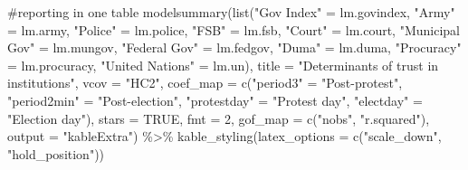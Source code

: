 \documentclass[
  letterpaper,
  DIV=11,
  numbers=noendperiod]{scrartcl}
\newenvironment{Shaded}{\begin{snugshade}}{\end{snugshade}}
\newcommand{\AttributeTok}[1]{\textcolor[rgb]{0.40,0.45,0.13}{#1}}
\newcommand{\CommentTok}[1]{\textcolor[rgb]{0.37,0.37,0.37}{#1}}
\newcommand{\ConstantTok}[1]{\textcolor[rgb]{0.56,0.35,0.01}{#1}}
\newcommand{\DecValTok}[1]{\textcolor[rgb]{0.68,0.00,0.00}{#1}}
\newcommand{\FunctionTok}[1]{\textcolor[rgb]{0.28,0.35,0.67}{#1}}
\newcommand{\NormalTok}[1]{\textcolor[rgb]{0.00,0.23,0.31}{#1}}
\newcommand{\OtherTok}[1]{\textcolor[rgb]{0.00,0.23,0.31}{#1}}
\newcommand{\SpecialCharTok}[1]{\textcolor[rgb]{0.37,0.37,0.37}{#1}}
\newcommand{\StringTok}[1]{\textcolor[rgb]{0.13,0.47,0.30}{#1}}
\begin{document}
\begin{Shaded}
\begin{Highlighting}[]
\CommentTok{\#reporting in one table}
\FunctionTok{modelsummary}\NormalTok{(}\FunctionTok{list}\NormalTok{(}\StringTok{"Gov Index"} \OtherTok{=}\NormalTok{ lm.govindex, }\StringTok{"Army"} \OtherTok{=}\NormalTok{ lm.army, }\StringTok{"Police"} \OtherTok{=}\NormalTok{ lm.police, }
                  \StringTok{"FSB"} \OtherTok{=}\NormalTok{ lm.fsb, }\StringTok{"Court"} \OtherTok{=}\NormalTok{ lm.court, }\StringTok{"Municipal Gov"} \OtherTok{=}\NormalTok{ lm.mungov,}
                  \StringTok{"Federal Gov"} \OtherTok{=}\NormalTok{ lm.fedgov, }\StringTok{"Duma"} \OtherTok{=}\NormalTok{ lm.duma, }
                  \StringTok{"Procuracy"} \OtherTok{=}\NormalTok{ lm.procuracy, }\StringTok{"United Nations"} \OtherTok{=}\NormalTok{ lm.un),}
             \AttributeTok{title =} \StringTok{"Determinants of trust in institutions"}\NormalTok{,}
             \AttributeTok{vcov =} \StringTok{"HC2"}\NormalTok{,}
             \AttributeTok{coef\_map =} \FunctionTok{c}\NormalTok{(}\StringTok{"period3"} \OtherTok{=} \StringTok{"Post{-}protest"}\NormalTok{, }
             \StringTok{"period2min"} \OtherTok{=} \StringTok{"Post{-}election"}\NormalTok{, }\StringTok{"protestday"} \OtherTok{=} \StringTok{"Protest day"}\NormalTok{, }
             \StringTok{"electday"} \OtherTok{=} \StringTok{"Election day"}\NormalTok{),}
             \AttributeTok{stars =} \ConstantTok{TRUE}\NormalTok{, }\AttributeTok{fmt =} \DecValTok{2}\NormalTok{, }\AttributeTok{gof\_map =} \FunctionTok{c}\NormalTok{(}\StringTok{"nobs"}\NormalTok{, }\StringTok{"r.squared"}\NormalTok{),}
             \AttributeTok{output =} \StringTok{"kableExtra"}\NormalTok{) }\SpecialCharTok{\%\textgreater{}\%} 
   \FunctionTok{kable\_styling}\NormalTok{(}\AttributeTok{latex\_options =} \FunctionTok{c}\NormalTok{(}\StringTok{"scale\_down"}\NormalTok{, }\StringTok{"hold\_position"}\NormalTok{))}
\end{Highlighting}
\end{Shaded}
\end{document}
